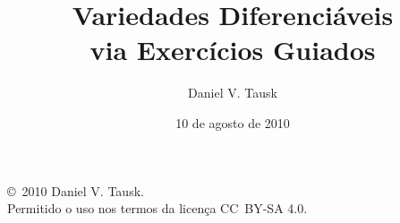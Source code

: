 \documentclass[oneside,11pt]{amsart}
\title[Variedades Diferenciáveis via Exercícios Guiados]{Variedades Diferenciáveis \\ via Exercícios Guiados}
\author{Daniel V. Tausk}
\date{10 de agosto de 2010}
\theoremstyle{remark}\newtheorem{exercise}{Exercício}[section]
\theoremstyle{plain}\newtheorem{teo}{Teorema}[section]
\theoremstyle{plain}\newtheorem{lem}[teo]{Lema}
\theoremstyle{plain}\newtheorem{prop}[teo]{Proposição}
\theoremstyle{definition}\newtheorem{defin}[teo]{Definição}
\theoremstyle{remark}\newtheorem{rem}[teo]{Observação}
\theoremstyle{definition}\newtheorem{example}[teo]{Exemplo}
\numberwithin{equation}{section}
\begin{document}
\maketitle

\noindent
\copyright\ 2010
Daniel V. Tausk.
\\
Permitido o uso nos termos da licença CC~BY-SA 4.0.


\renewcommand{\contentsline}[3]{\csname novo#1\endcsname{#2}{#3}}
\newcommand{\novochapter}[2]{\bigskip\hbox to \hsize{\vbox{\advance\hsize by -1cm\baselineskip=12pt\parfillskip=0pt\leftskip=3cm\noindent\hskip -2cm #1\leaders\hbox{.}\hfil\hfil\par}$\,$#2\hfil}}
\newcommand{\novosection}[2]{\medskip\hbox to \hsize{\vbox{\advance\hsize by -1cm\baselineskip=12pt\parfillskip=0pt\leftskip=3.5cm\noindent\hskip -2cm #1\leaders\hbox{.}\hfil\hfil\par}$\,$#2\hfil}}
\newcommand{\novosubsection}[2]{\baselineskip=12pt}%
\tableofcontents
\end{document}
